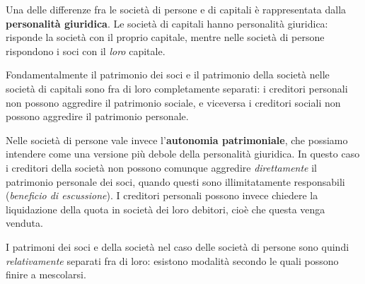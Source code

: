 \documentclass[a4paper,11pt]{article}
\begin{document}
Una delle differenze fra le società di persone e di capitali è rappresentata dalla \textbf{personalità giuridica}.
Le società di capitali hanno personalità giuridica: risponde la società con il proprio capitale, mentre nelle società di persone rispondono i soci con il \textit{loro} capitale.

Fondamentalmente il patrimonio dei soci e il patrimonio della società nelle società di capitali sono fra di loro completamente separati: i creditori personali non possono aggredire il patrimonio sociale, e viceversa i creditori sociali non possono aggredire il patrimonio personale.

Nelle società di persone vale invece l'\textbf{autonomia patrimoniale}, che possiamo intendere come una versione più debole della personalità giuridica.
In questo caso i creditori della società non possono comunque aggredire \textit{direttamente} il patrimonio personale dei soci, quando questi sono illimitatamente responsabili (\textit{beneficio di escussione}).
I creditori personali possono invece chiedere la liquidazione della quota in società dei loro debitori, cioè che questa venga venduta.

I patrimoni dei soci e della società nel caso delle società di persone sono quindi \textit{relativamente} separati fra di loro: esistono modalità secondo le quali possono finire a mescolarsi.
\end{document}
